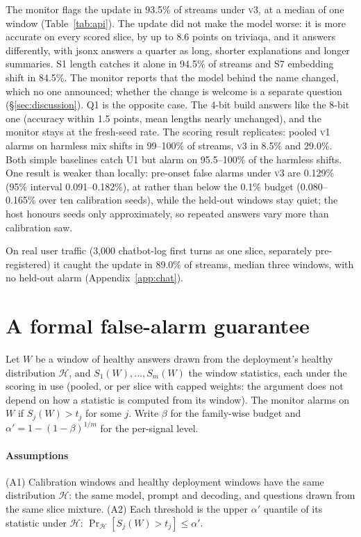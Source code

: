 \documentclass{article}
\newcommand{\vone}{\textsc{v1}}
\newcommand{\vthree}{\textsc{v3}}
\begin{document}
The monitor flags the update in 93.5\% of streams under \vthree{}, at a median of
one window (Table~\ref{tab:api}). The update did not make the model worse: it is
more accurate on every scored slice, by up to 8.6 points on \textsf{triviaqa}, and
it answers differently, with \textsf{jsonx} answers a quarter as long, shorter
explanations and longer summaries. S1 length catches it alone in 94.5\% of streams and S7 embedding shift
in 84.5\%. The monitor reports that the model behind the name changed, which no
one announced; whether the change is welcome is a separate question
(\S\ref{sec:discussion}). Q1 is the opposite case. The 4-bit
build answers like the 8-bit one (accuracy within 1.5 points, mean lengths nearly
unchanged),
and the monitor stays at the fresh-seed rate. The scoring result replicates:
pooled \vone{} alarms on harmless mix shifts in 99--100\% of streams, \vthree{} in
8.5\% and 29.0\%. Both simple baselines catch U1 but alarm on 95.5--100\% of
the harmless shifts. One result is weaker than locally:
pre-onset false alarms under \vthree{} are 0.129\% (95\% interval 0.091--0.182\%),
at rather than below the 0.1\% budget (0.080--0.165\% over ten calibration
seeds), while the held-out windows stay quiet; the host honours seeds only
approximately, so repeated answers vary more than calibration saw.

On real user traffic (3{,}000 chatbot-log first turns as one slice, separately
pre-registered) it caught the update in 89.0\% of streams, median three windows,
with no held-out alarm (Appendix~\ref{app:chat}).

\section{A formal false-alarm guarantee}
\label{app:guarantee}
Let $W$ be a window of healthy answers drawn from the deployment's healthy
distribution $\mathcal{H}$, and $S_1(W),\dots,S_m(W)$ the window statistics, each
under the scoring in use (pooled, or per slice with capped weights: the argument
does not depend on how a statistic is computed from its window). The monitor alarms
on $W$ if $S_j(W)>t_j$ for some $j$. Write $\beta$ for the family-wise budget and
$\alpha'=1-(1-\beta)^{1/m}$ for the per-signal level.

\paragraph{Assumptions}
(A1) Calibration windows and healthy deployment windows have the same distribution
$\mathcal{H}$: the same model, prompt and decoding, and questions drawn from the
same slice mixture. (A2) Each threshold is the upper $\alpha'$ quantile of its
statistic under $\mathcal{H}$: $\Pr_{\mathcal{H}}[S_j(W)>t_j]\le\alpha'$.
\end{document}
